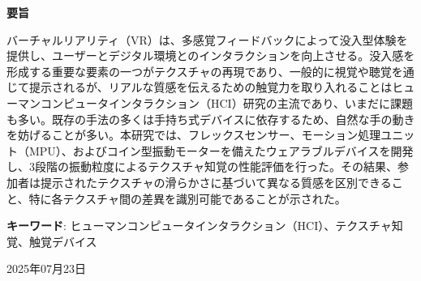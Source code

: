 \documentclass[uplatex,
12pt, %
a4paper,
english, %
oneside,
titlepage,
singlespacing, %
liststotoc, %
headsepline,
]{MastersDoctoralThesis} %
\begin{document}
\begin{center}
    \textbf{要旨} %
\end{center}
\vspace{0.5cm} %

		\begin{CJK*}{UTF8}{min}
			バーチャルリアリティ（VR）は、多感覚フィードバックによって没入型体験を提供し、ユーザーとデジタル環境とのインタラクションを向上させる。没入感を形成する重要な要素の一つがテクスチャの再現であり、一般的に視覚や聴覚を通じて提示されるが、リアルな質感を伝えるための触覚力を取り入れることはヒューマンコンピュータインタラクション（HCI）研究の主流であり、いまだに課題も多い。既存の手法の多くは手持ち式デバイスに依存するため、自然な手の動きを妨げることが多い。本研究では、フレックスセンサー、モーション処理ユニット（MPU）、およびコイン型振動モーターを備えたウェアラブルデバイスを開発し、3段階の振動粒度によるテクスチャ知覚の性能評価を行った。その結果、参加者は提示されたテクスチャの滑らかさに基づいて異なる質感を区別できること、特に各テクスチャ間の差異を識別可能であることが示された。
		\vspace{5mm}
		
		
		\textbf{キーワード}: ヒューマンコンピュータインタラクション（HCI）、テクスチャ知覚、触覚デバイス
		
		{}
		\end{CJK*}

\vspace{2cm} %
\begin{center}
  \begin{CJK*}{UTF8}{min}
      {2025年07月23日} %
      {}
		\end{CJK*}
\end{center}



		
\end{document}
